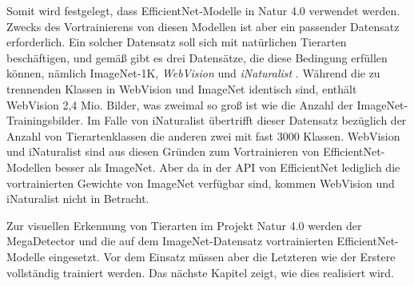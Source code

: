 Somit wird festgelegt, dass EfficientNet-Modelle in Natur 4.0 verwendet werden. Zwecks des Vortrainierens von diesen Modellen ist aber ein passender Datensatz erforderlich. Ein solcher Datensatz soll sich mit natürlichen Tierarten beschäftigen, und gemäß \cite{MLDatasetsPWC} gibt es drei Datensätze, die diese Bedingung erfüllen können, nämlich ImageNet-1K, \emph{WebVision} \cite{li2017webvision} und \emph{iNaturalist} \cite{vanhorn2018inaturalist, vanhorn2021benchmarking}. Während die zu trennenden Klassen in WebVision und ImageNet identisch sind, enthält WebVision 2,4 Mio. Bilder, was zweimal so groß ist wie die Anzahl der ImageNet-Trainingsbilder. Im Falle von iNaturalist übertrifft dieser Datensatz bezüglich der Anzahl von Tierartenklassen die anderen zwei mit fast 3000 Klassen. WebVision und iNaturalist sind aus diesen Gründen zum Vortrainieren von EfficientNet-Modellen besser als ImageNet. Aber da in der API von EfficientNet lediglich die vortrainierten Gewichte von ImageNet verfügbar sind, kommen WebVision und iNaturalist nicht in Betracht.

Zur visuellen Erkennung von Tierarten im Projekt Natur 4.0 werden der MegaDetector und die auf dem ImageNet-Datensatz vortrainierten EfficientNet-Modelle eingesetzt. Vor dem Einsatz müssen aber die Letzteren wie der Erstere vollständig trainiert werden. Das nächste Kapitel zeigt, wie dies realisiert wird.

